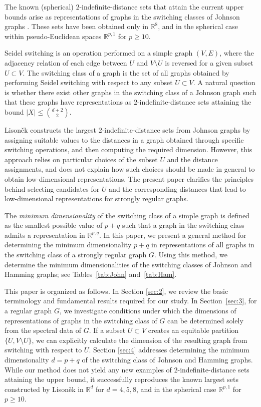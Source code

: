 \documentclass[a4paper, 11pt]{article}
\theoremstyle{definition}
\begin{document}
The known (spherical) $2$-indefinite-distance sets that attain the current upper bounds arise as representations of graphs in the switching classes of Johnson graphs \cite{L97}.  
These sets have been obtained only in $\mathbb{R}^8$, and in the spherical case within pseudo-Euclidean spaces $\mathbb{R}^{p,1}$ for $p \geq 10$.

Seidel switching is an operation performed on a simple graph $(V,E)$, where the adjacency relation of each edge between $U$ and $V \setminus U$ is reversed for a given subset $U \subset V$.  
The switching class of a graph is the set of all graphs obtained by performing Seidel switching with respect to any subset $U \subset V$.
A natural question is whether there exist other graphs in the switching class of a Johnson graph such that these graphs have representations as $2$-indefinite-distance sets attaining the bound $|X| \leq \binom{d+2}{2}$. 

Lison\v{e}k \cite{L97} constructs the largest $2$-indefinite-distance sets
from Johnson graphs by assigning suitable values to the distances
in a graph obtained through specific switching operations,
and then computing the required dimension.
However, this approach relies on particular choices of the subset $U$
and the distance assignments,
and does not explain how such choices should be made in general
to obtain low-dimensional representations.
The present paper clarifies the principles behind selecting candidates for $U$
and the corresponding distances
that lead to low-dimensional representations
for strongly regular graphs.



    The {\it minimum dimensionality} of the switching class of a simple graph is defined as the smallest possible value of $p+q$ such that a graph in the switching class admits a representation in $\mathbb{R}^{p,q}$. 
In this paper, we present a general method for determining the minimum dimensionality $p+q$ in representations of all graphs in the switching class of a strongly regular graph $G$.  
Using this method, we determine the minimum dimensionalities of the switching classes of Johnson and Hamming graphs; see Tables~\ref{tab:John} and~\ref{tab:Ham}.


This paper is organized as follows. In Section \ref{sec:2}, we review the basic terminology and fundamental results required for our study. 
In Section~\ref{sec:3}, for a regular graph $G$, we investigate conditions under which the dimensions of representations of graphs in the switching class of $G$ can be determined solely from the spectral data of $G$. 
If a subset $U\subset V$ creates an equitable partition $\{U,V\setminus U\}$, we can explicitly calculate the dimension of the resulting graph from switching with respect to $U$. 
Section \ref{sec:4} addresses determining the minimum dimensionality $d=p+q$ of the switching class of Johnson and Hamming graphs. 
While our method does not yield any new examples of $2$-indefinite-distance sets attaining the upper bound, it successfully reproduces the known largest sets constructed by Lisoněk in $\mathbb{R}^d$ for $d=4,5,8$, and in the spherical case $\mathbb{R}^{p,1}$ for $p \geq 10$.
\end{document}
